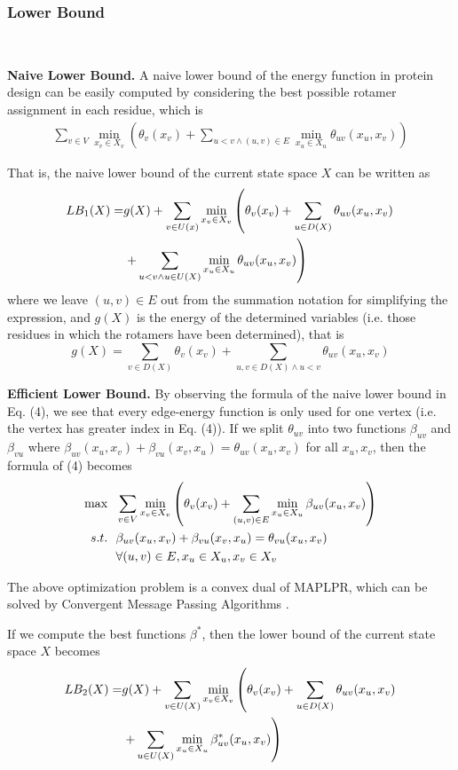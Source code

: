 \subsubsection{Lower Bound}\

\noindent\textbf{Naive Lower Bound.}
A naive lower bound of the energy function in protein design can be easily computed by considering the best possible rotamer assignment in each residue, which is
\begin{align}
\sum_{v\in V}\min_{x_v\in X_v}\left(\theta_v(x_v)+\sum_{u<v\wedge(u,v)\in E}\min_{x_u\in X_u}\theta_{uv}(x_u,x_v)\right)
\end{align}

That is, the naive lower bound of the current state space $X$ can be written as
\begin{align}
LB_1(X)=&g(X)+\sum_{v\in U(x)}\min_{x_v\in X_v}\left(\theta_v(x_v)+\sum_{u\in D(X)}\theta_{uv}(x_u,x_v)\notag\right. \\
&\left.+\sum_{u<v\wedge u\in U(X)}\min_{x_u\in X_u}\theta_{uv}(x_u,x_v)\right)
\end{align}
where we leave $(u,v)\in E$ out from the summation notation for simplifying the expression, and $g(X)$ is the energy of the determined variables (i.e. those residues in which the rotamers have been determined), that is
\[
g(X) = \sum_{v\in D(X)}\theta_v(x_v)+\sum_{u,v\in D(X)\wedge u<v}\theta_{uv}(x_u,x_v)
\]

\noindent\textbf{Efficient Lower Bound.} By observing the formula of the naive lower bound in Eq. (4), we see that every edge-energy function is only used for one vertex (i.e. the vertex has greater index in Eq. (4)). If we split $\theta_{uv}$ into two functions $\beta_{uv}$ and $\beta_{vu}$ where $\beta_{uv}(x_u,x_v)+\beta_{vu}(x_v,x_u)=\theta_{uv}(x_u,x_v)$ for all $x_u,x_v$, then the formula of (4) becomes
\begin{align}
\max & \ \ \sum_{v\in V}\min_{x_v\in X_v}\left(\theta_v(x_v)+\sum_{(u,v)\in E}\min_{x_u\in X_u}\beta_{uv}(x_u,x_v)\right) \\
s.t. & \ \ \beta_{uv}(x_u,x_v)+\beta_{vu}(x_v,x_u)=\theta_{vu}(x_u,x_v) \notag \\
& \ \ \forall (u,v)\in E,x_u\in X_u,x_v\in X_v \notag
\end{align}

The above optimization problem is a convex dual of MAPLPR, which can be solved by Convergent Message Passing Algorithms \cite[]{globerson2008fixing}.

If we compute the best functions $\beta^*$, then the lower bound of the current state space $X$ becomes
\begin{align}
LB_2(X)=&g(X)+\sum_{v\in U(X)}\min_{x_v\in X_v}\left(\theta_v(x_v)+\sum_{u\in D(X)}\theta_{uv}(x_u,x_v)\right. \notag \\
&\left.+\sum_{u\in U(X)}\min_{x_u\in X_u}\beta_{uv}^*(x_u,x_v)\right)
\end{align}

